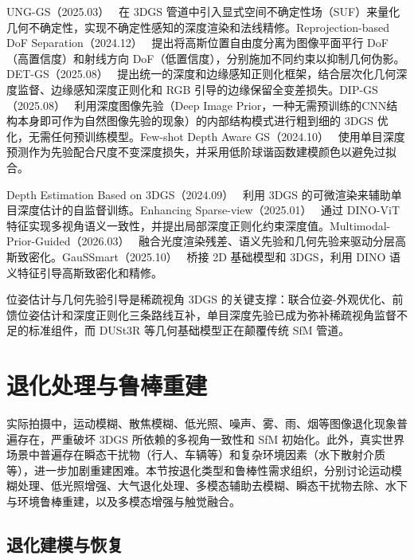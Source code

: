 UNG-GS（2025.03）~\cite{2503_11172} 在 3DGS 管道中引入显式空间不确定性场（SUF）来量化几何不确定性，实现不确定性感知的深度渲染和法线精修。Reprojection-based DoF Separation（2024.12）~\cite{2412_14568} 提出将高斯位置自由度分离为图像平面平行 DoF（高置信度）和射线方向 DoF（低置信度），分别施加不同约束以抑制几何伪影。DET-GS（2025.08）~\cite{2508_04099} 提出统一的深度和边缘感知正则化框架，结合层次化几何深度监督、边缘感知深度正则化和 RGB 引导的边缘保留全变差损失。DIP-GS（2025.08）~\cite{2508_07372} 利用深度图像先验（Deep Image Prior，一种无需预训练的CNN结构本身即可作为自然图像先验的现象）的内部结构模式进行粗到细的 3DGS 优化，无需任何预训练模型。Few-shot Depth Aware GS（2024.10）~\cite{2410_11080} 使用单目深度预测作为先验配合尺度不变深度损失，并采用低阶球谐函数建模颜色以避免过拟合。

Depth Estimation Based on 3DGS（2024.09）~\cite{2409_12323} 利用 3DGS 的可微渲染来辅助单目深度估计的自监督训练。Enhancing Sparse-view（2025.01）~\cite{2501_11508} 通过 DINO-ViT 特征实现多视角语义一致性，并提出局部深度正则化约束深度值。Multimodal-Prior-Guided（2026.03）~\cite{2603_02866} 融合光度渲染残差、语义先验和几何先验来驱动分层高斯致密化。GauSSmart（2025.10）~\cite{2510_14270} 桥接 2D 基础模型和 3DGS，利用 DINO 语义特征引导高斯致密化和精修。

\begin{takeaway}
位姿估计与几何先验引导是稀疏视角 3DGS 的关键支撑：联合位姿-外观优化、前馈位姿估计和深度正则化三条路线互补，单目深度先验已成为弥补稀疏视角监督不足的标准组件，而 DUSt3R 等几何基础模型正在颠覆传统 SfM 管道。
\end{takeaway}



\section{退化处理与鲁棒重建}
\label{sec:12_deblur}

实际拍摄中，运动模糊、散焦模糊、低光照、噪声、雾、雨、烟等图像退化现象普遍存在，严重破坏 3DGS 所依赖的多视角一致性和 SfM 初始化。此外，真实世界场景中普遍存在瞬态干扰物（行人、车辆等）和复杂环境因素（水下散射介质等），进一步加剧重建困难。本节按退化类型和鲁棒性需求组织，分别讨论运动模糊处理、低光照增强、大气退化处理、多模态辅助去模糊、瞬态干扰物去除、水下与环境鲁棒重建，以及多模态增强与触觉融合。

\subsection{退化建模与恢复}
\label{ss:12_3a}


